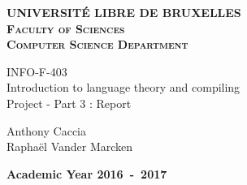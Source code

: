 \documentclass{article}
\newcommand{\hmwkClass}{INFO-F-403} %
\begin{document}
\begin{titlepage}
\begin{center}
\textbf{\textsc{UNIVERSIT\'E LIBRE DE BRUXELLES}}\\
\textbf{\textsc{Faculty of Sciences}}\\
\textbf{\textsc{Computer Science Department}}
\vfill{}
\begin{center}{\Huge \hmwkClass\\ \LARGE Introduction to language theory and compiling\\Project - Part 3 : Report}\end{center}{\Huge \par}
\begin{center}{\Large Anthony Caccia\\Raphaël Vander Marcken}\end{center}{\Huge \par}
\vfill{}
\vfill{}
\textbf{Academic Year 2016~-~2017}
\end{center}
\end{titlepage}
\end{document}
